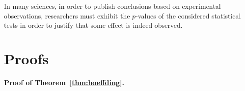 In many sciences, in order to publish conclusions based on experimental observations, researchers must exhibit the $p$-values of the considered statistical tests in order to justify that some effect is indeed observed.


\section{Proofs} %
\label{sec:chap03-proofs}


\paragraph{Proof of Theorem~\ref{thm:hoeffding}.} 

